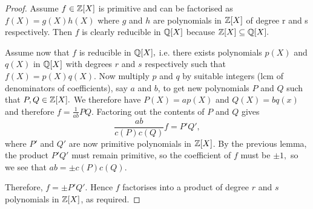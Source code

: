 \begin{proof}
  Assume $f\in\mathbb Z[X]$ is primitive and can be factorised as $f(X)=g(X)h(X)$ where $g$ and $h$ are polynomials in $\mathbb Z[X]$ of degree r and s respectively. Then $f$ is clearly reducible in $\mathbb Q[X]$ because $\mathbb Z[X]\subseteq\mathbb Q[X].$
  
  Assume now that $f$ is reducible in $\mathbb Q[X],$ i.e. there exists polynomials $p(X)$ and $q(X)$ in $\mathbb Q[X]$ with degrees $r$ and $s$ respectively such that $f(X)=p(X)q(X).$ Now multiply $p$ and $q$ by suitable integers (lcm of denominators of coefficients), say $a$ and $b$, to get new polynomials $P$ and $Q$ such that $P,Q\in \mathbb Z[X].$ We therefore have $P(X)=ap(X)$ and $Q(X)=bq(x)$ and therefore $f=\frac{1}{ab} PQ.$ Factoring out the contents of $P$ and $Q$ gives 
  $$
  \frac{ab}{c(P)c(Q)}f = P'Q',
  $$
  where $P'$ and $Q'$ are now primitive polynomials in $\mathbb Z[X]$. By the previous lemma, the product $P'Q'$ must remain primitive, so the coefficient of $f$ must be $\pm 1,$ so we see that $ab=\pm c(P)c(Q).$
  
  Therefore, $f = \pm P'Q'.$ Hence $f$  factorises into a product of degree $r$ and $s$ polynomials in $\mathbb Z[X]$, as required.
\end{proof}

